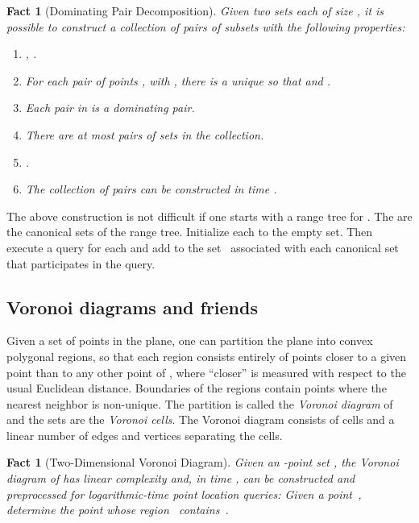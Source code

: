 \documentclass[11pt]{article}
\newtheorem{fact}[theorem]{Fact}
\theoremstyle{remark}
\begin{document}
\begin{fact}[Dominating Pair Decomposition]
  \label{fact:pairs-decomposition}
  Given two sets  each of size , it is possible to
  construct a collection of pairs of subsets  with the
  following properties:
  \begin{enumerate}
  \item , .
  \item For each pair of points ,  with ,
    there is a unique  so that  and .
  \item Each pair in  is a dominating pair.
  \item There are at most  pairs of sets in the collection.
  \item .
  \item The collection of pairs can be constructed in time .
  \end{enumerate}
\end{fact}

The above construction is not difficult if one starts with a range tree for . The  are the canonical sets of the range tree.  Initialize each  to the empty set.   Then execute a query for each  and add  to the set~ associated with each canonical set  that participates in the query.





\subsection{Voronoi diagrams and friends}
\label{sec:voronoi}

Given a set  of  points in the plane, one can partition the
plane into convex polygonal regions, so that each region 
consists entirely of points  closer to a given point  than
to any other point of , where ``closer'' is measured with respect to the usual Euclidean distance.  Boundaries of the regions contain points
where the nearest neighbor is non-unique.  The partition is called the
\emph{Voronoi diagram} of  and the sets  are the \emph{Voronoi
cells}.  The Voronoi diagram consists of  cells and a linear number
of edges and vertices separating the cells.



\begin{fact}[Two-Dimensional Voronoi Diagram]
  \label{fact:vor-2d}
  Given an -point set , the Voronoi diagram of 
  has linear complexity and, in time , can be constructed 
  and preprocessed for logarithmic-time \emph{point location} queries:
  Given a point~, determine the point  whose region~ contains~.
\end{fact}
\end{document}
